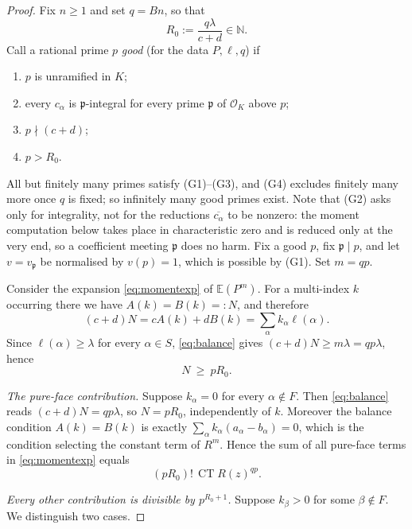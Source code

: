 \documentclass[10pt,a4paper]{amsart}
\numberwithin{equation}{section}
\DeclareMathOperator{\CT}{CT}
\newcommand{\N}{\mathbb{N}}
\newcommand{\E}{\mathbb{E}}
\begin{document}
\begin{proof}
Fix $n\ge1$ and set $q=Bn$, so that
\[
  R_0:=\frac{q\lambda}{c+d}\in\N .
\]
Call a rational prime $p$ \emph{good} (for the data $P,\ell,q$) if
\begin{enumerate}
\item[(G1)] $p$ is unramified in $K$;
\item[(G2)] every $c_\alpha$ is $\mathfrak p$-integral for every prime
$\mathfrak p$ of $\mathcal O_K$ above $p$;
\item[(G3)] $p\nmid(c+d)$;
\item[(G4)] $p>R_0$.
\end{enumerate}
All but finitely many primes satisfy (G1)--(G3), and (G4) excludes finitely many
more once $q$ is fixed; so infinitely many good primes exist. Note that (G2) asks
only for integrality, not for the reductions $\overline{c_\alpha}$ to be
nonzero: the moment computation below takes place in characteristic zero and is
reduced only at the very end, so a coefficient meeting $\mathfrak p$ does no
harm. Fix a good $p$, fix $\mathfrak p\mid p$, and let $v=v_{\mathfrak p}$ be
normalised by $v(p)=1$, which is possible by (G1). Set $m=qp$.

Consider the expansion \eqref{eq:momentexp} of $\E(P^m)$. For a multi-index $k$
occurring there we have $A(k)=B(k)=:N$, and therefore
\begin{equation}\label{eq:balance}
  (c+d)N=cA(k)+dB(k)=\sum_{\alpha}k_\alpha\ell(\alpha).
\end{equation}
Since $\ell(\alpha)\ge\lambda$ for every $\alpha\in S$, \eqref{eq:balance} gives
$(c+d)N\ge m\lambda=qp\lambda$, hence
\begin{equation}\label{eq:Nlower}
  N\ \ge\ pR_0 .
\end{equation}

\smallskip
\noindent\emph{The pure-face contribution.} Suppose $k_\alpha=0$ for every
$\alpha\notin F$. Then \eqref{eq:balance} reads $(c+d)N=qp\lambda$, so
$N=pR_0$, independently of $k$. Moreover the balance condition $A(k)=B(k)$ is
exactly $\sum_\alpha k_\alpha(a_\alpha-b_\alpha)=0$, which is the condition
selecting the constant term of $R^{m}$. Hence the sum of all pure-face terms in
\eqref{eq:momentexp} equals
\begin{equation}\label{eq:pureface}
  (pR_0)!\,\CT R(z)^{qp}.
\end{equation}

\smallskip
\noindent\emph{Every other contribution is divisible by $p^{R_0+1}$.} Suppose
$k_\beta>0$ for some $\beta\notin F$. We distinguish two cases.


\end{proof}
\end{document}
